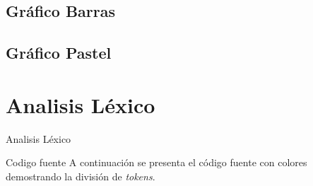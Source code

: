 \documentclass[10pt,xcolor={dvipsnames}]{beamer}
\begin{document}
    \subsection{Gráfico Barras}
        
    \subsection{Gráfico Pastel}
        

    \section{Analisis Léxico}
        \begin{frame}{Analisis Léxico}
        \begin{alertblock}{Codigo fuente}
            A continuación se presenta el código fuente con colores demostrando la división de \textit{tokens}.
            \end{alertblock}
        \end{frame}

        
\end{document}
